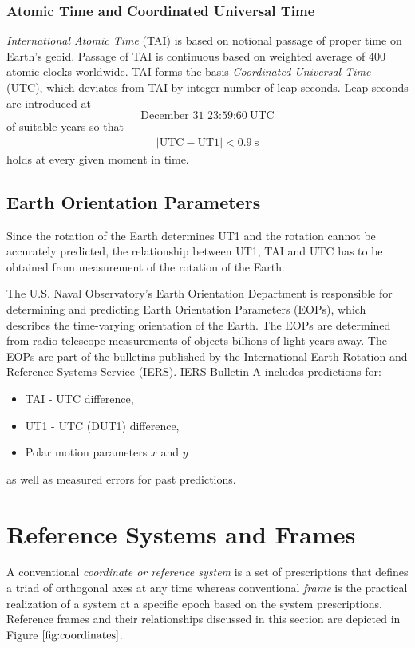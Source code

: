 \documentclass [12pt, a4paper] {article}
\begin{document}
\subsubsection{Atomic Time and Coordinated Universal Time}
\emph{International Atomic Time} (TAI) is based on notional passage of proper time on 
Earth's geoid. Passage of TAI is continuous based on weighted average of 400 
atomic clocks worldwide. TAI forms the basis \emph{Coordinated Universal Time} (UTC),
which deviates from TAI by integer number of leap seconds. Leap seconds are introduced
at 
\begin {displaymath}
  \textrm{December 31  23:59:60} \:\textrm{UTC}
\end {displaymath}
of suitable years so that 
\begin {eqnarray}
  |\textrm{UTC} - \textrm{UT1}| < 0.9\:\textrm{s}
\end {eqnarray}
holds at every given moment in time.

\subsection{Earth Orientation Parameters}
Since the rotation of the Earth determines UT1 and the rotation cannot be 
accurately predicted, the relationship between UT1, TAI and UTC has to be 
obtained from measurement of the rotation of the Earth. 

The U.S. Naval Observatory's Earth Orientation Department is responsible for
determining and predicting Earth Orientation Parameters (EOPs), which describes
the time-varying orientation of the Earth. The EOPs are determined from radio 
telescope measurements of objects billions of light years away. The EOPs are 
part of the bulletins published by the International Earth Rotation and Reference
Systems Service (IERS). IERS Bulletin A includes predictions for: 
\begin {itemize}
  \item TAI - UTC difference,
  \item UT1 - UTC (DUT1) difference,
  \item Polar motion parameters $x$ and $y$
\end {itemize}
as well as measured errors for past predictions.


\newpage
\section{Reference Systems and Frames}
A conventional \emph{coordinate or reference system} is a set of prescriptions that defines 
a triad of orthogonal axes at any time whereas conventional \emph{frame} is the practical 
realization of a system at a specific epoch based on the system prescriptions. Reference 
frames and their relationships discussed in this section are depicted in 
Figure $\ref{fig:coordinates}$.
\end{document}
